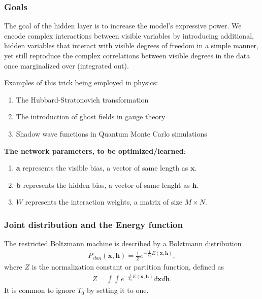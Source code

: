 \documentclass{beamer}
\begin{document}
\begin{frame}
\frametitle{Goals}

The goal of the hidden layer is to increase the model's expressive power. We encode complex interactions between visible variables by introducing additional, hidden variables that interact with visible degrees of freedom in a simple manner, yet still reproduce the complex correlations between visible degrees in the data once marginalized over (integrated out).

Examples of this trick being employed in physics: 
\begin{enumerate}
 \item The Hubbard-Stratonovich transformation

 \item The introduction of ghost fields in gauge theory

 \item Shadow wave functions in Quantum Monte Carlo simulations
\end{enumerate}

\noindent
\textbf{The network parameters, to be optimized/learned}:
\begin{enumerate}
 \item $\mathbf{a}$ represents the visible bias, a vector of same length as $\mathbf{x}$.

 \item $\mathbf{b}$ represents the hidden bias, a vector of same lenght as $\mathbf{h}$.

 \item $W$ represents the interaction weights, a matrix of size $M\times N$.
\end{enumerate}

\noindent
\end{frame}

\begin{frame}
\frametitle{Joint distribution and the Energy function}

The restricted Boltzmann machine is described by a Bolztmann distribution
\begin{align}
	P_{rbm}(\mathbf{x},\mathbf{h}) = \frac{1}{Z} e^{-\frac{1}{T_0}E(\mathbf{x},\mathbf{h})},
\end{align}
where $Z$ is the normalization constant or partition function, defined as 
\begin{align}
	Z = \int \int e^{-\frac{1}{T_0}E(\mathbf{x},\mathbf{h})} d\mathbf{x} d\mathbf{h}.
\end{align}
It is common to ignore $T_0$ by setting it to one.
\end{frame}
\end{document}
